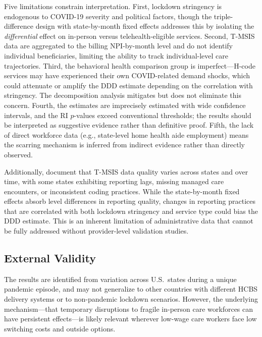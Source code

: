 \documentclass[12pt]{article}
\begin{document}
Five limitations constrain interpretation. First, lockdown stringency is endogenous to COVID-19 severity and political factors, though the triple-difference design with state-by-month fixed effects addresses this by isolating the \textit{differential} effect on in-person versus telehealth-eligible services. Second, T-MSIS data are aggregated to the billing NPI-by-month level and do not identify individual beneficiaries, limiting the ability to track individual-level care trajectories. Third, the behavioral health comparison group is imperfect---H-code services may have experienced their own COVID-related demand shocks, which could attenuate or amplify the DDD estimate depending on the correlation with stringency. The decomposition analysis mitigates but does not eliminate this concern. Fourth, the estimates are imprecisely estimated with wide confidence intervals, and the RI $p$-values exceed conventional thresholds; the results should be interpreted as suggestive evidence rather than definitive proof. Fifth, the lack of direct workforce data (e.g., state-level home health aide employment) means the scarring mechanism is inferred from indirect evidence rather than directly observed.

Additionally, \citet{macpac2021tmsis} document that T-MSIS data quality varies across states and over time, with some states exhibiting reporting lags, missing managed care encounters, or inconsistent coding practices. While the state-by-month fixed effects absorb level differences in reporting quality, changes in reporting practices that are correlated with both lockdown stringency and service type could bias the DDD estimate. This is an inherent limitation of administrative data that cannot be fully addressed without provider-level validation studies.

\subsection{External Validity}

The results are identified from variation across U.S.\ states during a unique pandemic episode, and may not generalize to other countries with different HCBS delivery systems or to non-pandemic lockdown scenarios. However, the underlying mechanism---that temporary disruptions to fragile in-person care workforces can have persistent effects---is likely relevant wherever low-wage care workers face low switching costs and outside options.
\end{document}
